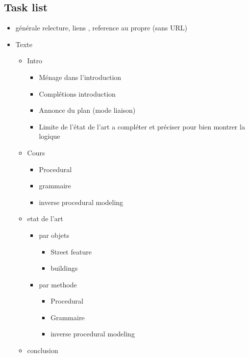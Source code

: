 	
		\subsection{Task list}
		
		
	\begin{itemize}\itemsep0.1pt
	\item générale
		relecture, liens , reference au propre (sans URL)
  \item Texte
  \begin{itemize}\itemsep0.1pt
      \item Intro
	        	\begin{itemize}\itemsep0.1pt
	        		\item Ménage dans l’introduction
	        		\item Complétions introduction
	        		\item Annonce du plan (mode liaison)
	        		\item Limite de l’état de l’art a compléter et préciser pour bien montrer la logique
	        	\end{itemize}
      \item Cours
	        	\begin{itemize}\itemsep0.1pt
		        	\item Procedural
		        	\item grammaire
		        	\item inverse procedural modeling 
       \end{itemize}
      \item etat de l'art
	        	\begin{itemize}\itemsep0.1pt
     					\item par objets
     						\begin{itemize}\itemsep0.1pt
  						    \item Street feature
  						    \item buildings
     						\end{itemize}
  				    \item par methode 
     				    	\begin{itemize}\itemsep0.1pt
 				    	      	\item Procedural
    				   			\item Grammaire
    				   			\item inverse procedural modeling 
  			    \end{itemize}
     	 	 \end{itemize}
      \item conclusion

\end{itemize}
\end{itemize}
